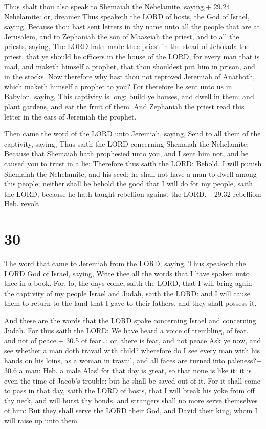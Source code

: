  Thus shalt thou also speak to Shemaiah the Nehelamite,
saying,+ 29.24 Nehelamite: or, dreamer  Thus speaketh the
LORD of hosts, the God of Israel, saying, Because thou hast sent letters
in thy name unto all the people that are at Jerusalem, and to Zephaniah
the son of Maaseiah the priest, and to all the priests, saying,
 The LORD hath made thee priest in the stead of Jehoiada
the priest, that ye should be officers in the house of the LORD, for
every man that is mad, and maketh himself a prophet, that thou shouldest
put him in prison, and in the stocks.  Now therefore why
hast thou not reproved Jeremiah of Anathoth, which maketh himself a
prophet to you?  For therefore he sent unto us in Babylon,
saying, This captivity is long: build ye houses, and dwell in them; and
plant gardens, and eat the fruit of them.  And Zephaniah
the priest read this letter in the ears of Jeremiah the prophet.

 Then came the word of the LORD unto Jeremiah, saying,
 Send to all them of the captivity, saying, Thus saith the
LORD concerning Shemaiah the Nehelamite; Because that Shemaiah hath
prophesied unto you, and I sent him not, and he caused you to trust in a
lie:  Therefore thus saith the LORD; Behold, I will punish
Shemaiah the Nehelamite, and his seed: he shall not have a man to dwell
among this people; neither shall he behold the good that I will do for
my people, saith the LORD; because he hath taught rebellion against the
LORD.+ 29.32 rebellion: Heb. revolt

\hypertarget{section-29}{%
\section{30}\label{section-29}}

 The word that came to Jeremiah from the LORD, saying,
 Thus speaketh the LORD God of Israel, saying, Write thee
all the words that I have spoken unto thee in a book.  For,
lo, the days come, saith the LORD, that I will bring again the captivity
of my people Israel and Judah, saith the LORD: and I will cause them to
return to the land that I gave to their fathers, and they shall possess
it.

 And these are the words that the LORD spake concerning
Israel and concerning Judah.  For thus saith the LORD; We
have heard a voice of trembling, of fear, and not of peace.+ 30.5 of
fear\ldots: or, there is fear, and not peace  Ask ye now,
and see whether a man doth travail with child? wherefore do I see every
man with his hands on his loins, as a woman in travail, and all faces
are turned into paleness?+ 30.6 a man: Heb. a male  Alas!
for that day is great, so that none is like it: it is even the time of
Jacob's trouble; but he shall be saved out of it.  For it
shall come to pass in that day, saith the LORD of hosts, that I will
break his yoke from off thy neck, and will burst thy bonds, and
strangers shall no more serve themselves of him:  But they
shall serve the LORD their God, and David their king, whom I will raise
up unto them.

